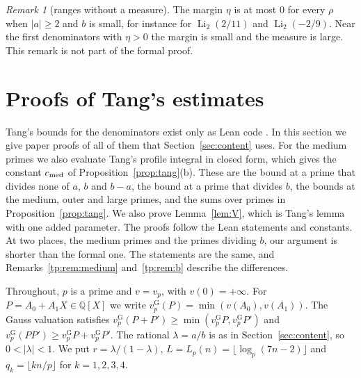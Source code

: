 \documentclass[11pt]{amsart}
\theoremstyle{definition}
\theoremstyle{remark}
\newtheorem{remark}[theorem]{Remark}
\numberwithin{equation}{section}
\newcommand{\Z}{\mathbb Z}
\newcommand{\Q}{\mathbb Q}
\newcommand{\R}{\mathbb R}
\newcommand{\N}{\mathbb N}
\newcommand{\Li}{\operatorname{Li}}
\newcommand{\vG}{v_p^{\mathrm G}}
\newcommand{\cont}{\operatorname{cont}}
\begin{document}
\begin{remark}[ranges without a measure]
The margin $\eta$ is at most $0$ for every $\rho$ when $|a|\ge2$ and $b$ is small, for instance for $\Li_2(2/11)$ and
$\Li_2(-2/9)$. Near the first denominators with $\eta>0$ the margin is small and the measure is large. This remark is
not part of the formal proof.
\end{remark}

\section{Proofs of Tang's estimates}\label{sec:tangproofs}

Tang's bounds for the denominators exist only as Lean code \cite{TangLi2}. In this section we give paper proofs of all
of them that Section~\ref{sec:content} uses. For the medium primes we also evaluate Tang's profile integral in closed
form, which gives the constant $c_{\rm med}$ of Proposition~\ref{prop:tang}(b). These are the bound at a prime that divides none of $a$, $b$ and $b-a$,
the bound at a prime that divides $b$, the bounds at the medium, outer and large primes, and the sums over primes in
Proposition~\ref{prop:tang}. We also prove Lemma~\ref{lem:V}, which is Tang's lemma with one added parameter. The
proofs follow the Lean statements and constants. At two places, the medium primes and the primes dividing $b$, our
argument is shorter than the formal one. The statements are the same, and Remarks~\ref{tp:rem:medium}
and~\ref{tp:rem:b} describe the differences.

Throughout, $p$ is a prime and $v=v_p$, with $v(0)=+\infty$. For $P=A_0+A_1X\in\Q[X]$ we write
$\vG(P)=\min(v(A_0),v(A_1))$. The Gauss valuation satisfies $\vG(P+P')\ge\min(\vG P,\vG P')$ and
$\vG(PP')\ge\vG P+\vG P'$. The rational $\lambda=a/b$ is as in Section~\ref{sec:content}, so $0<|\lambda|<1$. We put
$r=\lambda/(1-\lambda)$, $L=L_p(n)=\lfloor\log_p(7n-2)\rfloor$ and $q_k=\lfloor kn/p\rfloor$ for $k=1,2,3,4$.
\end{document}
